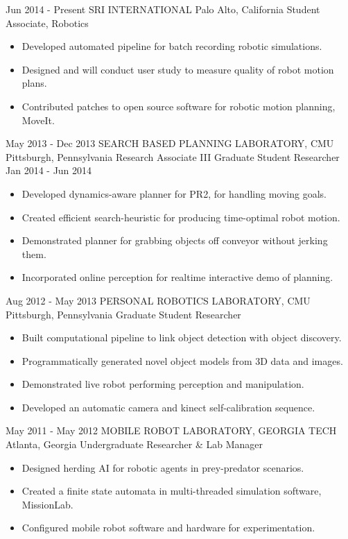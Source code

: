 \documentclass[]{friggeri-cv} %
\begin{document}
\begin{entrylist}
\jobentry
{Jun 2014 - Present}
{SRI INTERNATIONAL}
{Palo Alto, California}
{Student Associate, Robotics}
{\begin{itemize}
\item Developed automated pipeline for batch recording robotic simulations.
\item Designed and will conduct user study to measure quality of robot motion plans.
\item Contributed patches to open source software for robotic motion planning, MoveIt.
\end{itemize}}
\jjobentry
{May 2013 - Dec 2013}
{SEARCH BASED PLANNING LABORATORY, CMU}
{Pittsburgh, Pennsylvania}
{Research Associate III}
{Graduate Student Researcher}
{Jan 2014 - Jun 2014}
{\begin{itemize}\item Developed dynamics-aware planner for PR2, for handling moving goals.
\item Created efficient search-heuristic for producing time-optimal robot motion.
\item Demonstrated planner for grabbing objects off conveyor without jerking them.
\item Incorporated online perception for realtime interactive demo of planning.
\end{itemize}}
\jobentry
{Aug 2012 - May 2013}
{PERSONAL ROBOTICS LABORATORY, CMU}
{Pittsburgh, Pennsylvania}
{Graduate Student Researcher}
{\begin{itemize}\item Built computational pipeline to link object detection with object discovery.
\item Programmatically generated novel object models from 3D data and images.
\item Demonstrated live robot performing perception and manipulation.
\item Developed an automatic camera and kinect self-calibration sequence.
\end{itemize}}
\jobentry
{May 2011 - May 2012}
{MOBILE ROBOT LABORATORY, GEORGIA TECH}
{Atlanta, Georgia}
{Undergraduate Researcher \& Lab Manager}
{\begin{itemize}\item Designed herding AI for robotic agents in prey-predator scenarios.
\item Created a finite state automata in multi-threaded simulation software, MissionLab.
\item Configured mobile robot software and hardware for experimentation.
\end{itemize}}
\end{entrylist}
\end{document}
